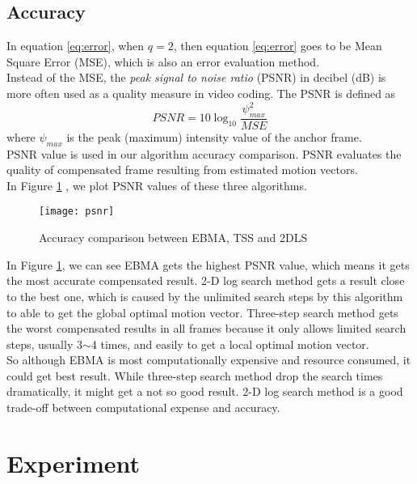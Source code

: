 \documentclass[a4paper, twocolumn]{article}
\begin{document}
	\subsection{Accuracy}
	In equation \ref{eq:error}, when $ q = 2 $, then equation \ref{eq:error} goes to be Mean Square Error (MSE), which is also an error evaluation method. \\
	Instead of the MSE, the \textit{peak signal to noise ratio} (PSNR) in decibel (dB) is more often used as a quality measure in video coding. The PSNR is defined as 
	\begin{equation}
		PSNR = 10 \log_{10} \frac{\psi_{max}^2}{MSE}
	\end{equation}
	where $ \psi_{max} $ is the peak (maximum) intensity value of the anchor frame.\\
	PSNR value is used in our algorithm accuracy comparison. PSNR evaluates the quality of compensated frame resulting from estimated motion vectors. \\
	In Figure \ref{fig:psnr} , we plot PSNR values of these three algorithms. 
	\begin{figure}[h]
	\centering
	\texttt{[image: psnr]}
	\caption{Accuracy comparison between EBMA, TSS and 2DLS}
	\label{fig:psnr}
	\end{figure}

	\noindent
	In Figure \ref{fig:psnr}, we can see EBMA gets the highest PSNR value, which means it gets the most accurate compensated result. 2-D log search method gets a result close to the best one, which is caused by the unlimited search steps by this algorithm to able to get the global optimal motion vector. Three-step search method gets the worst compensated results in all frames because it only allows limited search steps, usually 3$\sim$4 times, and easily to get a local optimal motion vector.\\
	So although EBMA is most computationally expensive and resource consumed, it could get best result. While three-step search method drop the search times dramatically, it might get a not so good result. 2-D log search method is a good trade-off between computational expense and accuracy.
	
	
	\section{Experiment}
\end{document}
